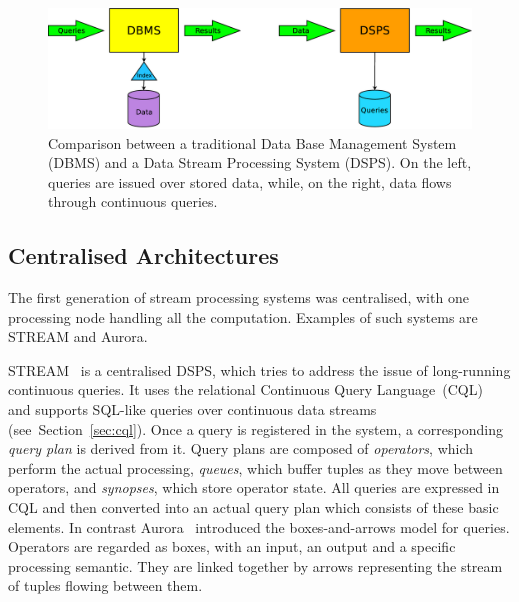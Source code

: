 \begin{figure}[b!] \centering \includegraphics[width=\textwidth]{img/tesi/dbms+dsms} \caption{Comparison
between a traditional Data Base Management System (DBMS) and a Data Stream Processing System (DSPS). On
the left, queries are issued over stored data, while, on the right, data flows through continuous
queries.}
\label{fig:dbms+dsms}
\end{figure}

\subsection*{Centralised Architectures}

The first generation of stream processing systems was centralised, with one processing node handling all
the computation. Examples of such systems are STREAM and Aurora.

STREAM~\cite{stream, stream-babcock, stream-chains} is a centralised DSPS, which tries to address the
issue of long-running continuous queries. It uses the relational Continuous Query
Language~(CQL)~\cite{cql} and supports SQL-like queries over continuous data
streams (see~Section~\ref{sec:cql}).
Once a query is registered in the system, a corresponding \textit{query plan} is derived from it.
Query plans are composed of \textit{operators}, which perform the actual processing, \textit{queues},
which buffer tuples as they move between operators, and \textit{synopses}, which store operator state.
All queries are expressed in CQL and then converted into an actual query plan which consists of these
basic elements.
In contrast Aurora~\cite{aurora} introduced the boxes-and-arrows model for queries. Operators are
regarded as boxes, with an input, an output and a specific processing semantic. They are linked
together by arrows representing the stream of tuples flowing between them.
			
